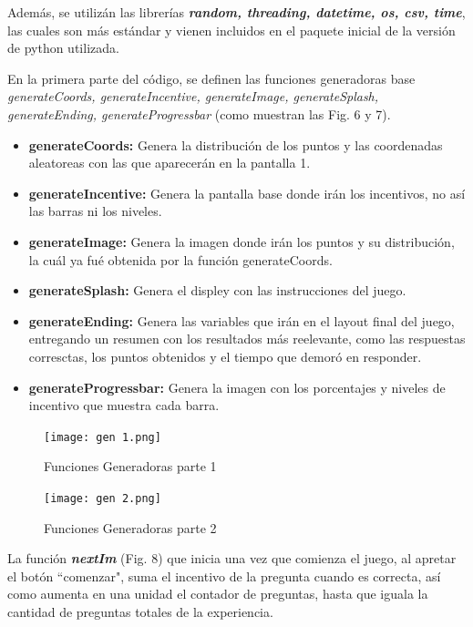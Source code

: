 \documentclass[11pt,letterpaper]{article}
\begin{document}
Además, se utilizán las librerías \textbf{\textit{random, threading, datetime, os, csv, time}}, las cuales son más estándar y vienen incluidos en el paquete inicial de la versión de python utilizada.

En la primera parte del código, se definen las funciones generadoras base \textit{generateCoords, generateIncentive, generateImage, generateSplash, generateEnding, generateProgressbar} (como muestran las Fig. 6 y 7).



\begin{itemize}
    \item \textbf{generateCoords:} Genera la distribución de los puntos y las coordenadas aleatoreas con las que aparecerán en la pantalla 1.
    \item \textbf{generateIncentive:} Genera la pantalla base donde irán los incentivos, no así las barras ni los niveles.
    \item \textbf{generateImage:} Genera la imagen donde irán los puntos y su distribución, la cuál ya fué obtenida por la función generateCoords.
    \item \textbf{generateSplash:} Genera el displey con las instrucciones del juego.
    \item \textbf{generateEnding:} Genera las variables que irán en el layout final del juego, entregando un resumen con los resultados más reelevante, como las respuestas corresctas, los puntos obtenidos y el tiempo que demoró en responder.
    \item \textbf{generateProgressbar:} Genera la imagen con los porcentajes y niveles de incentivo que muestra cada barra.
\end{itemize}

\begin{figure}[h]
        \centering
        \texttt{[image: gen 1.png]}
        \caption{Funciones Generadoras parte 1}
    \end{figure}
    
\begin{figure}[h]
        \centering
        \texttt{[image: gen 2.png]}
        \caption{Funciones Generadoras parte 2}
    \end{figure}

La función \textbf{\textit{nextIm}} (Fig. 8) que inicia una vez que comienza el juego, al apretar el botón ``comenzar", suma el incentivo de la pregunta cuando es correcta, así como aumenta en una unidad el contador de preguntas, hasta que iguala la cantidad de preguntas totales de la experiencia.
\end{document}
